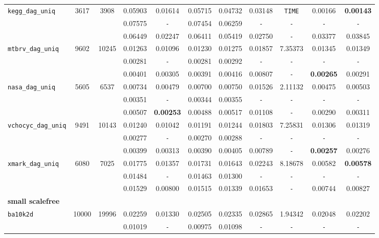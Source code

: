 {\begin{tabular}{ l c c | c c c c c c c c }
\hline
\verb|kegg_dag_uniq| & 3617 & 3908 & 0.05903 & 0.01614 & 0.05715 & 0.04732 & 0.03148 & \verb|TIME| & 0.00166 & \textbf{0.00143} \\
 &  &  & 0.07575 & \verb|-| & 0.07454 & 0.06259 & \verb|-| & \verb|-| & \verb|-| & \verb|-| \\
 &  &  & 0.06449 & 0.02247 & 0.06411 & 0.05419 & 0.02750 & \verb|-| & 0.03377 & 0.03845 \\
\hline
\verb|mtbrv_dag_uniq| & 9602 & 10245 & 0.01263 & 0.01096 & 0.01230 & 0.01275 & 0.01857 & 7.35373 & 0.01345 & 0.01349 \\
 &  &  & 0.00281 & \verb|-| & 0.00281 & 0.00292 & \verb|-| & \verb|-| & \verb|-| & \verb|-| \\
 &  &  & 0.00401 & 0.00305 & 0.00391 & 0.00416 & 0.00807 & \verb|-| & \textbf{0.00265} & 0.00291 \\
\hline
\verb|nasa_dag_uniq| & 5605 & 6537 & 0.00734 & 0.00479 & 0.00700 & 0.00750 & 0.01526 & 2.11132 & 0.00475 & 0.00503 \\
 &  &  & 0.00351 & \verb|-| & 0.00344 & 0.00355 & \verb|-| & \verb|-| & \verb|-| & \verb|-| \\
 &  &  & 0.00507 & \textbf{0.00253} & 0.00488 & 0.00517 & 0.01108 & \verb|-| & 0.00290 & 0.00311 \\
\hline
\verb|vchocyc_dag_uniq| & 9491 & 10143 & 0.01240 & 0.01042 & 0.01191 & 0.01244 & 0.01803 & 7.25831 & 0.01306 & 0.01319 \\
 &  &  & 0.00277 & \verb|-| & 0.00270 & 0.00288 & \verb|-| & \verb|-| & \verb|-| & \verb|-| \\
 &  &  & 0.00399 & 0.00313 & 0.00390 & 0.00405 & 0.00789 & \verb|-| & \textbf{0.00257} & 0.00276 \\
\hline
\verb|xmark_dag_uniq| & 6080 & 7025 & 0.01775 & 0.01357 & 0.01731 & 0.01643 & 0.02243 & 8.18678 & 0.00582 & \textbf{0.00578} \\
 &  &  & 0.01484 & \verb|-| & 0.01463 & 0.01300 & \verb|-| & \verb|-| & \verb|-| & \verb|-| \\
 &  &  & 0.01529 & 0.00800 & 0.01515 & 0.01339 & 0.01653 & \verb|-| & 0.00744 & 0.00827 \\
\hline
\multicolumn{11}{l}{\textbf{small scalefree}} \\
\hline
\verb|ba10k2d| & 10000 & 19996 & 0.02259 & 0.01330 & 0.02505 & 0.02335 & 0.02865 & 1.94342 & 0.02048 & 0.02202 \\
 &  &  & 0.01019 & \verb|-| & 0.00975 & 0.01098 & \verb|-| & \verb|-| & \verb|-| & \verb|-| \\

\end{tabular}}
